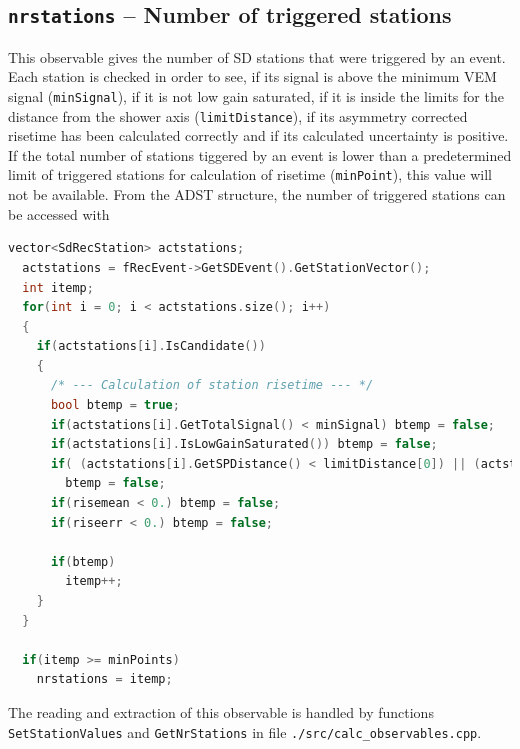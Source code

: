 \documentclass[12pt,a4paper]{report}
\begin{document}
\subsection{\texttt{nrstations} -- Number of triggered stations}
This observable gives the number of SD stations that were triggered by an event. Each station is checked in order to see, if its signal is above the minimum VEM signal (\texttt{minSignal}), if it is not low gain saturated, if it is inside the limits for the distance from the shower axis (\texttt{limitDistance}), if its asymmetry corrected risetime has been calculated correctly and if its calculated uncertainty is positive. If the total number of stations tiggered by an event is lower than a predetermined limit of triggered stations for calculation of risetime (\texttt{minPoint}), this value will not be available. From the ADST structure, the number of triggered stations can be accessed with
\begin{lstlisting}[language=C++]
  vector<SdRecStation> actstations;
  actstations = fRecEvent->GetSDEvent().GetStationVector();
  int itemp;
  for(int i = 0; i < actstations.size(); i++)
  {
    if(actstations[i].IsCandidate())
    {
      /* --- Calculation of station risetime --- */
      bool btemp = true;
      if(actstations[i].GetTotalSignal() < minSignal) btemp = false;
      if(actstations[i].IsLowGainSaturated()) btemp = false;
      if( (actstations[i].GetSPDistance() < limitDistance[0]) || (actstations[i].GetSPDistance() > limitDistance[1]))
        btemp = false;
      if(risemean < 0.) btemp = false;
      if(riseerr < 0.) btemp = false;

      if(btemp)
        itemp++;
    }
  }

  if(itemp >= minPoints)
    nrstations = itemp;
\end{lstlisting}
The reading and extraction of this observable is handled by functions \texttt{SetStationValues} and \texttt{GetNrStations} in file \texttt{./src/calc\_observables.cpp}.
\end{document}
